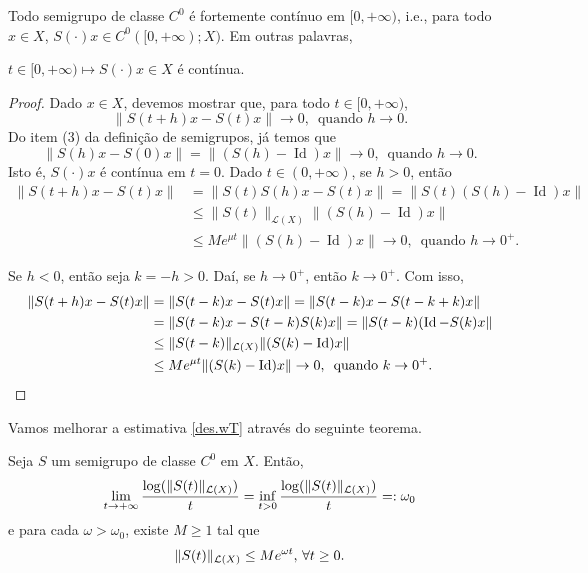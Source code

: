 \begin{corollary}\label{Scontinua}
Todo semigrupo de classe $C^0$ é fortemente contínuo em $[0,+\infty)$, i.e., 
para todo $x\in X$, $S(\cdot)x\in C^0([0,+\infty);X)$. Em outras palavras,
\begin{center}
$t\in [0,+\infty)\longmapsto S(\cdot)x\in  X$ é contínua.
\end{center}
\end{corollary}

\begin{proof}
    Dado $x\in X$, devemos mostrar que, para todo $t\in [0,+\infty)$,
    \[\|S(t+h)x-S(t)x\|\to 0,\, \text{ quando } h\to 0.\]
Do item (3) da definição de semigrupos, já temos que
  \[\|S(h)x-S(0)x\|=\|(S(h)-\operatorname{Id})x\|\to 0,\, \text{ quando } h\to 0.\]
Isto é, $S(\cdot)x$ é contínua em $t=0$. Dado $t\in (0,+\infty)$, se $h>0$, então
\begin{align*}
    \|S(t+h)x-S(t)x\|& =\|S(t)S(h)x-S(t)x\|=\|S(t)(S(h)-\operatorname{Id})x\|\\
    & \leq \|S(t)\|_{\mathcal{L}(X)}\|(S(h)-\operatorname{Id})x\|\\
    & \leq Me^{\mu t}\|(S(h)-\operatorname{Id})x\|\to 0,\, \text{ quando } h\to 0^+.
\end{align*}

Se $h<0$, então seja $k=-h>0$. Daí, se $h\to 0^+$, então $k\to0^+$. Com isso,
\begin{align*}
    \|S(t+h)x-S(t)x\|& = \|S(t-k)x-S(t)x\|=\|S(t-k)x-S(t-k+k)x\|\\
    & =\|S(t-k)x-S(t-k)S(k)x\|=\|S(t-k)(\operatorname{Id}-S(k)x\|\\
    & \leq \|S(t-k)\|_{\mathcal{L}(X)}\|(S(k)-\operatorname{Id})x\|\\
    & \leq Me^{\mu t}\|(S(k)-\operatorname{Id})x\|\to 0,\, \text{ quando } k\to 0^+.
\end{align*}
\end{proof}

Vamos melhorar a estimativa \eqref{des.wT} através do seguinte teorema. 
\begin{theorem}\label{th2.5}
Seja $S$ um semigrupo de classe $C^0$ em $X$. Então,
\[\lim\limits_{t\to +\infty}\frac{\log(\|S(t)\|_{\mathcal{L}(X)})}{t}=\inf\limits_{t>0}\frac{\log(\|S(t)\|_{\mathcal{L}(X)})}{t}=:\omega_0\]
e para cada $\omega>\omega_0$, existe {$M\geq 1$} tal que 
\begin{equation*}
{\|S(t)\|_{\mathcal{L}(X)}\leq Me^{\omega t},\, \forall t\geq 0.}
\end{equation*}
\end{theorem} 


